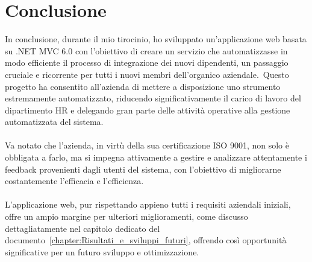 \chapter*{Conclusione} %
%
In conclusione, durante il mio tirocinio, ho sviluppato un'applicazione web basata su .NET MVC 6.0 con 
l'obiettivo di creare un servizio che automatizzasse in modo efficiente il 
processo di integrazione dei nuovi dipendenti, un passaggio cruciale e ricorrente per 
tutti i nuovi membri dell'organico aziendale.\ Questo progetto ha consentito 
all'azienda di mettere a disposizione uno strumento estremamente automatizzato, riducendo 
significativamente il carico di lavoro del dipartimento HR e delegando gran parte delle 
attività operative alla gestione automatizzata del sistema.
\\ \\
Va notato che l'azienda, in virtù della sua certificazione ISO 9001, non solo è obbligata a farlo, 
ma si impegna attivamente a gestire e analizzare attentamente i feedback provenienti dagli utenti del sistema, 
con l'obiettivo di migliorarne costantemente l'efficacia e l'efficienza.
\\ \\
L'applicazione web, pur rispettando appieno tutti i requisiti aziendali iniziali, 
offre un ampio margine per ulteriori miglioramenti, come discusso dettagliatamente nel capitolo dedicato del documento~\ref{chapter:Risultati_e_sviluppi_futuri}, 
offrendo così opportunità significative per un futuro sviluppo e ottimizzazione.